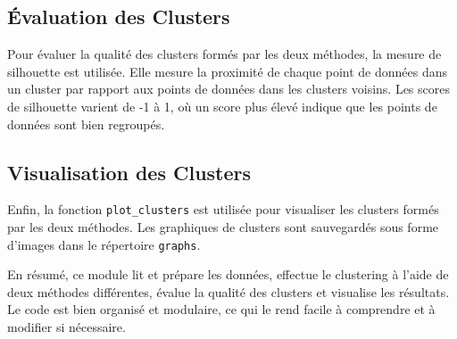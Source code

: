 \subsection{Évaluation des Clusters}
Pour évaluer la qualité des clusters formés par les deux méthodes, la mesure de silhouette est utilisée. Elle mesure la proximité de chaque point de données dans un cluster par rapport aux points de données dans les clusters voisins. Les scores de silhouette varient de -1 à 1, où un score plus élevé indique que les points de données sont bien regroupés.

\subsection{Visualisation des Clusters}
Enfin, la fonction \texttt{plot\_clusters} est utilisée pour visualiser les clusters formés par les deux méthodes. Les graphiques de clusters sont sauvegardés sous forme d'images dans le répertoire \texttt{graphs}.

En résumé, ce module lit et prépare les données, effectue le clustering à l'aide de deux méthodes différentes, évalue la qualité des clusters et visualise les résultats. Le code est bien organisé et modulaire, ce qui le rend facile à comprendre et à modifier si nécessaire.

